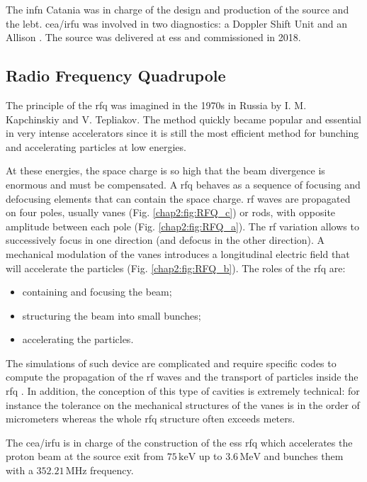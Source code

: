\begin{refsection}
  The \acrshort{infn} Catania was in charge of the design and production of the source and the \acrshort{lebt}. \acrshort{cea}/\acrshort{irfu} was involved in two diagnostics: a Doppler Shift Unit \cite{Thomas:IPAC2017-MOPVA037} and an Allison \cite{Tuske:IPAC2017-MOPAB023}. The source was delivered at \acrshort{ess} and commissioned in 2018.

  \subsection{Radio Frequency Quadrupole}
  The principle of the \acrfull{rfq} was imagined in the 1970s in Russia by I. M. Kapchinskiy and V. Tepliakov. The method quickly became popular and essential in very intense accelerators since it is still the most efficient method for bunching and accelerating particles at low energies.

  At these energies, the space charge is so high that the beam divergence is enormous and must be compensated. A \acrshort{rfq} behaves as a sequence of focusing and defocusing elements that can contain the space charge. \acrshort{rf} waves are propagated on four poles, usually vanes (Fig. \ref{chap2:fig:RFQ_c}) or rods, with opposite amplitude between each pole (Fig. \ref{chap2:fig:RFQ_a}). The \acrshort{rf} variation allows to successively focus in one direction (and defocus in the other direction). A mechanical modulation of the vanes introduces a longitudinal electric field that will accelerate the particles (Fig. \ref{chap2:fig:RFQ_b}). The roles of the \acrshort{rfq} are:
  \begin{itemize}
    \item containing and focusing the beam;
    \item structuring the beam into small bunches;
    \item accelerating the particles.
  \end{itemize}

  

  The simulations of such device are complicated and require specific codes to compute the propagation of the \acrshort{rf} waves and the transport of particles inside the \acrshort{rfq} \cite{Duperrier2000}. In addition, the conception of this type of cavities is extremely technical: for instance the tolerance on the mechanical structures of the vanes is in the order of micrometers whereas the whole \acrshort{rfq} structure often exceeds meters.

  The \acrshort{cea}/\acrshort{irfu} is in charge of the construction of the \acrshort{ess} \acrshort{rfq} \cite{ChirpazIPAC2016} which accelerates the proton beam at the source exit from $75\,\mathrm{keV}$ up to $3.6\,\mathrm{MeV}$ and bunches them with a $352.21\,\mathrm{MHz}$ frequency.


\end{refsection}
